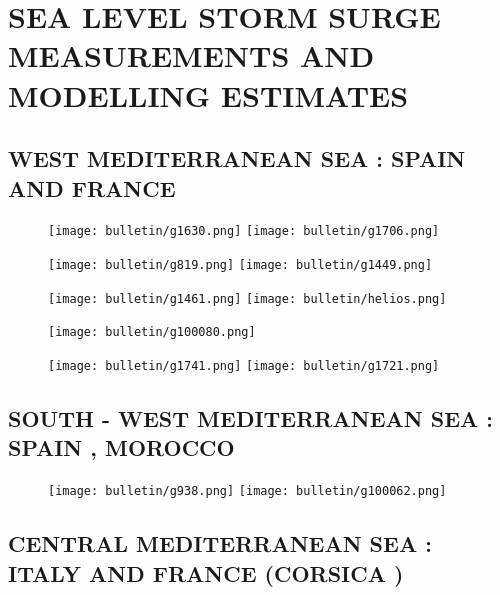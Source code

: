 \documentclass[a4paper]{article}
\renewcommand{\\}{\ {\large\textperiodcentered}\ }
\renewcommand{\\}{\ {\large\textperiodcentered}\ }
\begin{document}
\newpage


\section*{SEA LEVEL STORM SURGE MEASUREMENTS AND MODELLING ESTIMATES}

\subsection*{WEST MEDITERRANEAN SEA : SPAIN AND FRANCE}

\begin{figure}[h]
\centerline{
\texttt{[image: bulletin/g1630.png]}
\texttt{[image: bulletin/g1706.png]}
}
\end{figure}

\begin{figure}[h]
\centerline{
\texttt{[image: bulletin/g819.png]}
\texttt{[image: bulletin/g1449.png]}
}
\end{figure}

\begin{figure}[h]
\centerline{
\texttt{[image: bulletin/g1461.png]}
\texttt{[image: bulletin/helios.png]}
}
\end{figure}

\begin{figure}[h]
\texttt{[image: bulletin/g100080.png]}
\end{figure}

\begin{figure}[h]
\centerline{
\texttt{[image: bulletin/g1741.png]}
\texttt{[image: bulletin/g1721.png]}
}
\end{figure}

\clearpage

\subsection*{SOUTH - WEST MEDITERRANEAN SEA : SPAIN , MOROCCO}

\begin{figure}[h]
\centerline{
\texttt{[image: bulletin/g938.png]}
\texttt{[image: bulletin/g100062.png]}
}
\end{figure}

\clearpage

\subsection*{CENTRAL MEDITERRANEAN SEA : ITALY AND FRANCE (CORSICA )}
\end{document}
